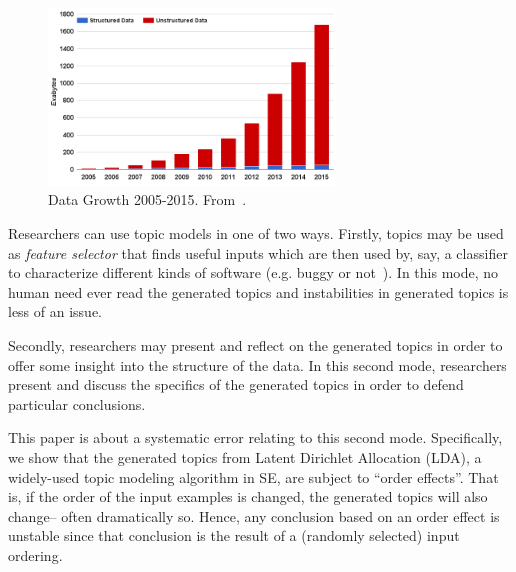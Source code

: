 \documentclass[10pt,conference]{IEEEtran}
\theoremstyle{break}
\begin{document}


\begin{figure}[!b]
  \captionsetup{justification=centering}
  \includegraphics[width=3in]{./fig/data.png}
  \caption{Data Growth 2005-2015. From~\cite{nadkarni2014structured}.}
  \label{fig: data}
\end{figure}


\noindent
Researchers can use topic models in one of two ways.
Firstly,
topics may be used as {\em feature selector} that finds useful inputs
which are then used by, say, a classifier to characterize different kinds of software (e.g. buggy or not~\cite{chen2016topic}).
In this mode, no human need ever read the generated topics and instabilities
in generated topics is less of an issue.

Secondly, researchers may present and reflect on the generated topics in order to
  offer some insight into the structure of the data.  In this second mode,
  researchers present and discuss the specifics of the generated topics in order
  to defend particular conclusions.

  This paper is about a 
  systematic error relating to this second mode.
  Specifically, we show that the generated topics from Latent Dirichlet
  Allocation (LDA), a widely-used topic modeling algorithm in SE, are subject to
  ``order effects''.  That is, if the order of the input examples is changed,
  the generated topics will also change-- often dramatically so.  Hence, any
  conclusion based on an order effect is unstable since that conclusion is the
  result of a (randomly selected) input ordering. 
\end{document}

